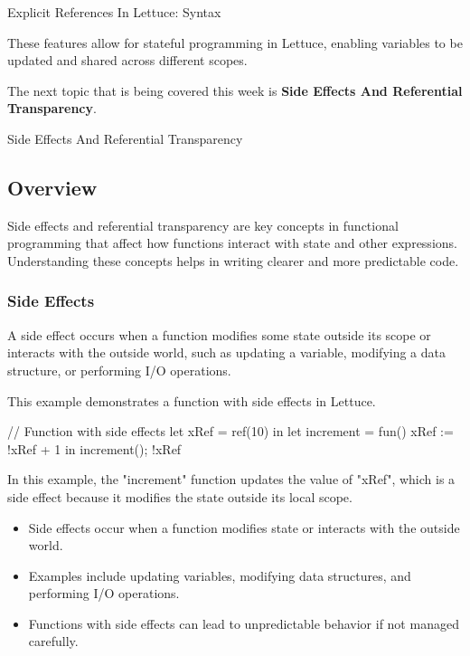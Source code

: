 \begin{notes}{Explicit References In Lettuce: Syntax}
\begin{highlight}
        These features allow for stateful programming in Lettuce, enabling variables to be updated and shared across different scopes.
    
    \end{highlight}
\end{notes}

The next topic that is being covered this week is \textbf{Side Effects And Referential Transparency}.

\begin{notes}{Side Effects And Referential Transparency}
    \subsection*{Overview}

    Side effects and referential transparency are key concepts in functional programming that affect how functions interact with state and other expressions. Understanding these concepts helps in 
    writing clearer and more predictable code.
    
    \subsubsection*{Side Effects}
    
    A side effect occurs when a function modifies some state outside its scope or interacts with the outside world, such as updating a variable, modifying a data structure, or performing I/O operations.
    
    \begin{highlight}
    
        This example demonstrates a function with side effects in Lettuce.
    
    \begin{code}[Lettuce]
    // Function with side effects
    let xRef = ref(10) in
    let increment = fun() {
        xRef := !xRef + 1
    } in
    increment(); !xRef
    \end{code}
    
        In this example, the "increment" function updates the value of "xRef", which is a side effect because it modifies the state outside its local scope.
    
        \begin{itemize}
            \item Side effects occur when a function modifies state or interacts with the outside world.
            \item Examples include updating variables, modifying data structures, and performing I/O operations.
            \item Functions with side effects can lead to unpredictable behavior if not managed carefully.
        \end{itemize}
    

\end{highlight}
\end{notes}
